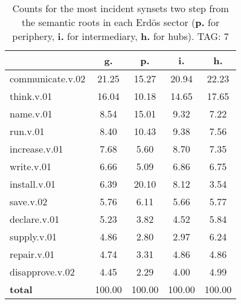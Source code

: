\begin{table}[h!]
\begin{center}
\begin{tabular}{| l | c | c | c | c |}\hline
 & g. & p. & i. & h. \\\hline
communicate.v.02 & 21.25  & 15.27  & 20.94  & 22.23 \\\hline
think.v.01 & 16.04  & 10.18  & 14.65  & 17.65 \\\hline
name.v.01 & 8.54  & 15.01  & 9.32  & 7.22 \\\hline
run.v.01 & 8.40  & 10.43  & 9.38  & 7.56 \\\hline
increase.v.01 & 7.68  & 5.60  & 8.70  & 7.35 \\\hline
write.v.01 & 6.66  & 5.09  & 6.86  & 6.75 \\\hline
install.v.01 & 6.39  & 20.10  & 8.12  & 3.54 \\\hline
save.v.02 & 5.76  & 6.11  & 5.66  & 5.77 \\\hline
declare.v.01 & 5.23  & 3.82  & 4.52  & 5.84 \\\hline
supply.v.01 & 4.86  & 2.80  & 2.97  & 6.24 \\\hline
repair.v.01 & 4.74  & 3.31  & 4.86  & 4.86 \\\hline
disapprove.v.02 & 4.45  & 2.29  & 4.00  & 4.99 \\\hline
{{\bf total}} & 100.00  & 100.00  & 100.00  & 100.00 \\\hline
\end{tabular}
\caption{Counts for the most incident synsets two step from the semantic roots in each Erd\"os sector ({\bf p.} for periphery, {\bf i.} for intermediary, {\bf h.} for hubs). TAG: 7}
\end{center}
\end{table}